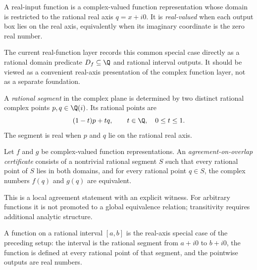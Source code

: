 \begin{definition}\label{def:real-fun-raw}
A real-input function is a complex-valued function representation whose domain
is restricted to the rational real axis \(q=x+i0\).  It is \emph{real-valued}
when each output box lies on the real axis, equivalently when its imaginary
coordinate is the zero real number.

The current real-function layer records this common special case directly as
a rational domain predicate \(D_f\subseteq\Q\) and rational interval outputs.
It should be viewed as a convenient real-axis presentation of the complex
function layer, not as a separate foundation.
\end{definition}

\begin{definition}\label{def:rational-segment}
A \emph{rational segment} in the complex plane is determined by two distinct
rational complex points \(p,q\in\Q(i)\).  Its rational points are
\[
  (1-t)p+tq,\qquad t\in\Q,\quad 0\le t\le 1.
\]
The segment is real when \(p\) and \(q\) lie on the rational real axis.
\end{definition}

\begin{definition}\label{def:function-agrees-on-overlap}
Let \(f\) and \(g\) be complex-valued function representations.  An
\emph{agreement-on-overlap certificate} consists of a nontrivial rational
segment \(S\) such that every rational point of \(S\) lies in both domains, and
for every rational point \(q\in S\), the complex numbers \(f(q)\) and \(g(q)\)
are equivalent.

This is a local agreement statement with an explicit witness.  For arbitrary
functions it is not promoted to a global equivalence relation; transitivity
requires additional analytic structure.
\end{definition}

\begin{definition}\label{def:function-on-interval}
A function on a rational interval \([a,b]\) is the real-axis special case of
the preceding setup: the interval is the rational segment from \(a+i0\) to
\(b+i0\), the function is defined at every rational point of that segment, and
the pointwise outputs are real numbers.
\end{definition}

